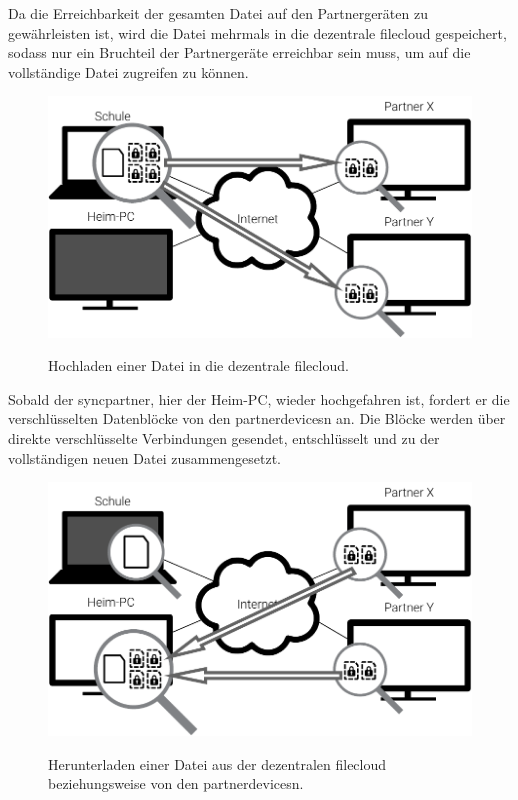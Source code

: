 Da die Erreichbarkeit der gesamten Datei auf den Partnergeräten zu gewährleisten
ist, wird die Datei mehrmals
in die dezentrale \gls{filecloud} gespeichert, sodass nur ein Bruchteil der
Partnergeräte erreichbar sein muss, um auf die vollständige Datei zugreifen zu
können.

\begin{figure}[htb]
	\centering
  \includegraphics[]{images/sblit_upload}
	\label{sblit_upload}
  \caption{Hochladen einer Datei in die dezentrale \gls{filecloud}.}
\end{figure}

Sobald der \gls{syncpartner}, hier der Heim-PC, wieder hochgefahren ist, fordert er die
verschlüsselten Datenblöcke von den \glspl{partnerdevice}n an. Die Blöcke werden über
direkte verschlüsselte Verbindungen gesendet, entschlüsselt und zu der
vollständigen neuen Datei zusammengesetzt.

\begin{figure}[htb]
	\centering
  \includegraphics[]{images/sblit_download}
	\label{sblit_download}
  \caption{Herunterladen einer Datei aus der dezentralen \gls{filecloud} beziehungsweise
	von den \glspl{partnerdevice}n.}
\end{figure}
